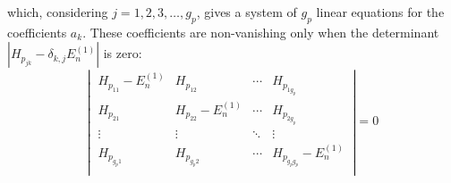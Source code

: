 which, considering $j = 1, 2, 3, \dots, g_p$, gives a system of $g_p$ linear equations for the coefficients $a_k$. These coefficients are non-vanishing only when the determinant $|H_{p_{jk}}-\delta_{k,j} E_n^{(1)}|$ is zero:
\begin{equation}
    \left|\ \begin{matrix}
        H_{p_{11}} - E_n^{(1)} & H_{p_{12}} & \cdots & H_{p_{1g_p}} \\
        H_{p_{21}} & H_{p_{22}}- E_n^{(1)} & \cdots & H_{p_{2g_p}} \\
        \vdots & \vdots & \ddots & \vdots \\
        H_{p_{g_p1}} & H_{p_{g_p2}} & \cdots & H_{p_{g_pg_p}}- E_n^{(1)} \\
    \end{matrix}\ \right| = 0
\end{equation}

